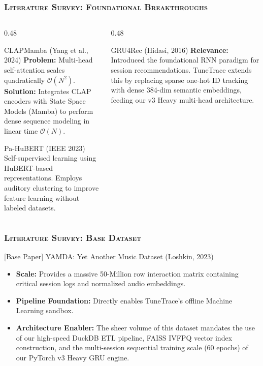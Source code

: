 \documentclass[aspectratio=169,10pt]{beamer}
\begin{document}
\begin{frame}
  \frametitle{\textsc{Literature Survey: Foundational Breakthroughs}}

  \begin{columns}[T]
    \begin{column}{0.48\textwidth}
      \begin{exampleblock}{CLAPMamba (Yang et al., 2024)}
        \fontsize{7.5pt}{9.5pt}\selectfont
        \textbf{Problem:} Multi-head self-attention scales quadratically $\mathcal{O}(N^2)$. \\
        \textbf{Solution:} Integrates CLAP encoders with State Space Models (Mamba) to perform dense sequence modeling in linear time $\mathcal{O}(N)$.
      \end{exampleblock}
      \vspace{0.5mm}
      \begin{exampleblock}{Pa-HuBERT (IEEE 2023)}
        \fontsize{7.5pt}{9.5pt}\selectfont
        Self-supervised learning using HuBERT-based representations. Employs auditory clustering to improve feature learning without labeled datasets.
      \end{exampleblock}
    \end{column}

    \begin{column}{0.48\textwidth}
      \begin{block}{GRU4Rec (Hidasi, 2016)}
        \fontsize{7.5pt}{9.5pt}\selectfont
        \textbf{Relevance:} Introduced the foundational RNN paradigm for session recommendations. TuneTrace extends this by replacing sparse one-hot ID tracking with dense 384-dim semantic embeddings, feeding our v3 Heavy multi-head architecture.
      \end{block}
    \end{column}
  \end{columns}
\end{frame}

\begin{frame}
  \frametitle{\textsc{Literature Survey: Base Dataset}}

  \begin{block}{[Base Paper] YAMDA: Yet Another Music Dataset (Loshkin, 2023)}
    \fontsize{8.5pt}{10.5pt}\selectfont
    \begin{itemize}
        \item \textbf{Scale:} Provides a massive 50-Million row interaction matrix containing critical session logs and normalized audio embeddings.
        \item \textbf{Pipeline Foundation:} Directly enables TuneTrace's offline Machine Learning sandbox.
        \item \textbf{Architecture Enabler:} The sheer volume of this dataset mandates the use of our high-speed DuckDB ETL pipeline, FAISS IVFPQ vector index construction, and the multi-session sequential training scale (60 epochs) of our PyTorch v3 Heavy GRU engine.
    \end{itemize}
  \end{block}
\end{frame}
\end{document}
